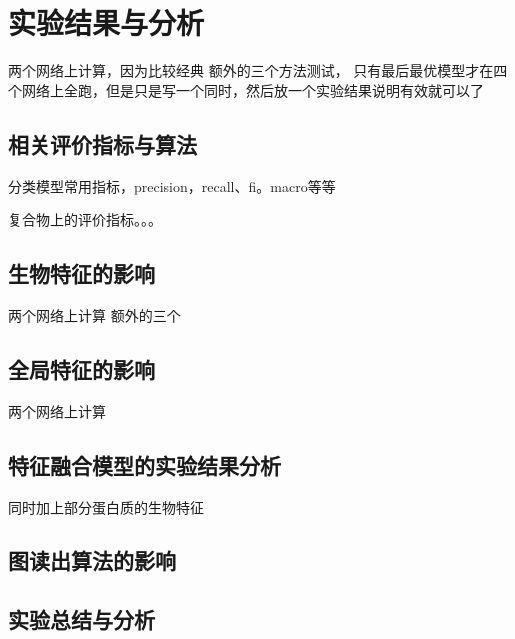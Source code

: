 \chapter{实验结果与分析}
\label{chapter:resultAndOther}
两个网络上计算，因为比较经典
额外的三个方法测试，
只有最后最优模型才在四个网络上全跑，但是只是写一个同时，然后放一个实验结果说明有效就可以了
\section{相关评价指标与算法}
\label{section:metrix}

分类模型常用指标，precision，recall、fi。macro等等

复合物上的评价指标。。。

\section{生物特征的影响}
\label{section:biofeatAnasys}
两个网络上计算
额外的三个
\section{全局特征的影响}
\label{section:globalStructfeatAnasys}
两个网络上计算
\section{特征融合模型的实验结果分析}
\label{section:fusionfeatAnasys}
同时加上部分蛋白质的生物特征

\section{图读出算法的影响}
\label{section:gpoolAnasys}

\section{实验总结与分析}
\label{section:resultSummary}
